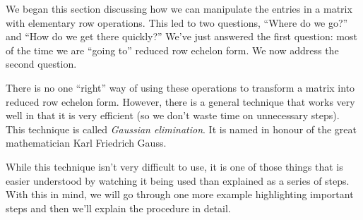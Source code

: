 \medskip

We began this section discussing how we can manipulate the entries in a matrix with elementary row operations. This led to two questions, ``Where do we go?'' and ``How do we get there quickly?'' We've just answered the first question: most of the time we are ``going to'' reduced row echelon form. We now address the second question.

There is no one ``right'' way of using these operations to transform a matrix into reduced row echelon form. However, there is a general technique that works very well in that it is very efficient (so we don't waste time on unnecessary steps). This technique is called 
\textit{Gaussian elimination}. It is named in honour of the great mathematician Karl Friedrich Gauss.

While this technique isn't very difficult to use, it is one of those things that is easier understood by watching it being used than explained as a series of steps. With this in mind, we will go through one more example highlighting important steps and then we'll explain the procedure in detail.

\medskip

